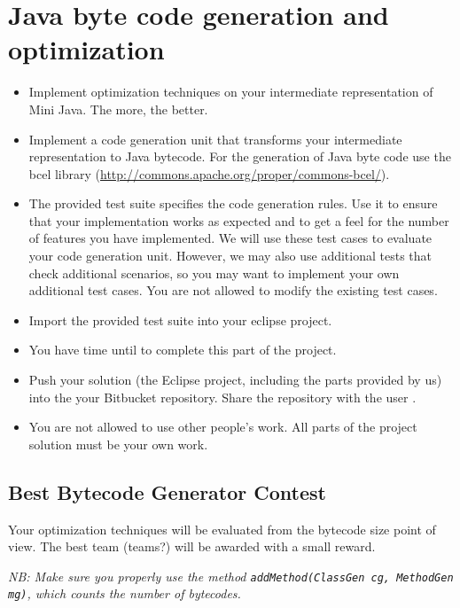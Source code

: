 

\subtitle{Semester project}



\makefancytitle

\setcounter{section}{2}
\section{Java byte code generation and optimization}

\begin{itemize} 
\item Implement optimization techniques on your intermediate representation of Mini Java. The more, the better. 

\item Implement a code generation unit that transforms your intermediate representation to Java bytecode.
  For the generation of Java byte code use the bcel library (\url{http://commons.apache.org/proper/commons-bcel/}).


\item The provided test suite specifies the code generation rules.
  Use it to ensure that your implementation works as expected and to get a feel for the number of features you have implemented.
  We will use these test cases to evaluate your code generation unit.
  However, we may also use additional tests that check additional scenarios, so you may want to implement your own additional test cases.
  You are not allowed to modify the existing test cases.

\item Import the provided test suite into your eclipse project.

\item You have time until  to complete this part of the project.

\item Push your solution (the Eclipse project, including the parts provided by us) into the your Bitbucket repository. Share the repository with the user . 

\item You are not allowed to use other people’s work.
  All parts of the project solution must be your own work.

\end{itemize}


\subsection{Best Bytecode Generator Contest}
Your optimization techniques will be evaluated from the bytecode size point of view.
The best team (teams?) will be awarded with a small reward.

\emph{NB: Make sure you properly use the method \texttt{addMethod(ClassGen cg, MethodGen mg)}, which counts the number of bytecodes.}



